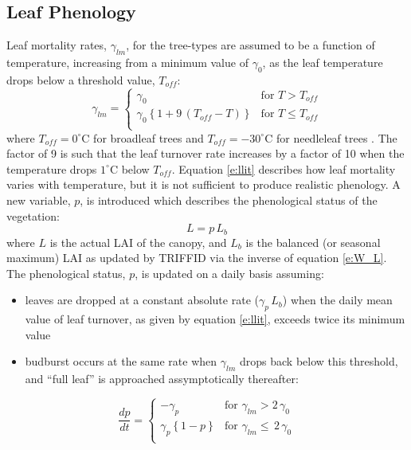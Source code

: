\documentclass[a4paper]{article}
\begin{document}
\subsection{Leaf Phenology} \label{s:phenol}
Leaf mortality rates, $\gamma_{lm}$, for the tree-types are assumed to
be a function of temperature, increasing from a minimum value of
$\gamma_{0}$, as the leaf temperature drops below a threshold value,
$T_{off}$:
\begin{equation}
\gamma_{lm} = \left \{ \begin{array}{lll}
         \gamma_{0} & \mbox{for $T > T_{off}$}  \\ [5mm]
   \gamma_{0} \left\{1 + 9 \, (T_{off}-T) \right\}
     & \mbox{for $T \leq T_{off}$} \\ [5mm]
             \end{array} \right.
\label{e:llit}
\end{equation}
where $T_{off}=0^{\circ}$C for broadleaf trees and $T_{off}=
-30^{\circ}$C for needleleaf trees \citep{Woo87}. The factor of
9 is such that the leaf turnover rate increases by a factor of 10 when
the temperature drops $1^{\circ}$C below $T_{off}$.  Equation
\eqref{e:llit} describes how leaf mortality varies with temperature,
but it is not sufficient to produce realistic phenology.  A new
variable, $p$, is introduced which describes the phenological status
of the vegetation:
\begin{equation}
L = p \, L_{b}
\end{equation}
where $L$ is the actual LAI of the canopy, and $L_{b}$ is the balanced
(or seasonal maximum) LAI as updated by TRIFFID via the inverse of
equation \eqref{e:W_L}.  The phenological status, $p$, is updated on a
daily basis assuming:
\begin{itemize}
\item leaves are dropped at a constant absolute rate ($\gamma_{p} \, L_{b}$) 
when the daily mean value of leaf turnover, as given by equation \eqref{e:llit}, 
exceeds twice its minimum value
\item  budburst occurs at the same rate when $\gamma_{lm}$ drops back below this 
threshold, and ``full leaf'' is approached assymptotically thereafter:
\end{itemize}
\begin{equation}
\frac{dp}{dt} = \left \{ \begin{array}{lll}
         - \gamma_{p} & \mbox{for $\gamma_{lm} > 2 \,\gamma_{0}$}   \\ [5mm]
         \gamma_{p} \left\{1 - p \right\} & \mbox{for $\gamma_{lm} \leq \,2 \, \gamma_{0}$}   \\ [5mm]
             \end{array} \right.
\label{e:p}
\end{equation}
\end{document}
